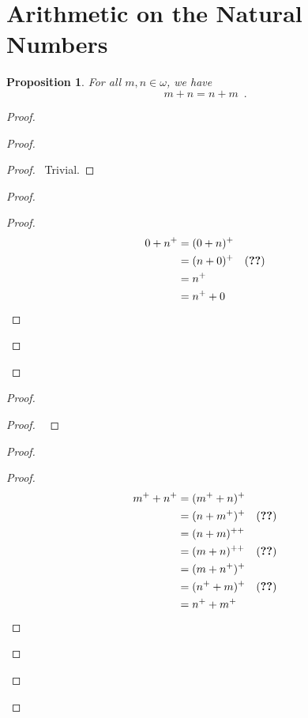 \documentclass{report}
\let\qed\relax
\newtheorem{prop}[ax]{Proposition}
\theoremstyle{definition}
\begin{document}
\section{Arithmetic on the Natural Numbers}

\begin{prop}
\label{prop:plus_comm}
For all $m,n \in \omega$, we have
\[ m + n = n + m \enspace . \]
\end{prop}

\begin{proof}
\pf
{}
\begin{proof}
	\begin{proof}
		\pf\ Trivial.
	\end{proof}
	\begin{proof}
		\begin{proof}
			\pf
			\begin{align*}
			0 + n^+ & = (0 + n)^+ \\
			& = (n + 0)^+ & (\text{\stepref{ii}}) \\
			& = n^+ \\
			& = n^+ + 0
			\end{align*}
		\end{proof}
	\end{proof}
\end{proof}
\begin{proof}
	\begin{proof}
		\pf\ 
	\end{proof}
	\begin{proof}
		\begin{proof}
			\pf
			\begin{align*}
				m^+ + n^+ & = (m^+ + n)^+ \\
				& = (n + m^+)^+ & (\text{\stepref{ii}}) \\
				& = (n + m)^{++} \\
				& = (m + n)^{++} & (\text{\stepref{b}}) \\
				& = (m + n^+)^+ \\
				& = (n^+ + m)^+ & (\text{\stepref{b}}) \\
				& = n^+ + m^+
\end{align*}					
		\end{proof}
	\end{proof}
\end{proof}
\qed
\end{proof}
\end{document}
